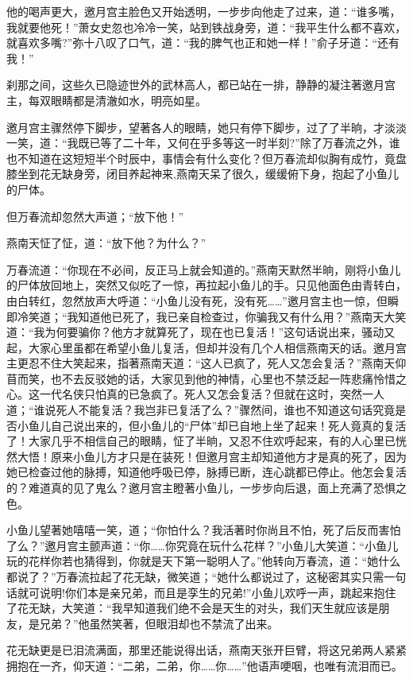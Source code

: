 \documentclass[12pt,oneside]{book}
\begin{document}
他的喝声更大，邀月宫主脸色又开始透明，一步步向他走了过来，道：``谁多嘴，我就要他死！''萧女史忽也冷冷一笑，站到铁战身旁，道：``我平生什么都不喜欢，就喜欢多嘴?''弥十八叹了口气，道：``我的脾气也正和她一样！''俞子牙道：``还有我！''

刹那之间，这些久已隐迹世外的武林高人，都已站在一排，静静的凝注著邀月宫主，每双眼睛都是清澈如水，明亮如星。

邀月宫主骤然停下脚步，望著各人的眼睛，她只有停下脚步，过了了半晌，才淡淡一笑，道：``我既已等了二十年，又何在乎多等这一时半刻?''除了万春流之外，谁也不知道在这短短半个时辰中，事情会有什么变化？但万春流却似胸有成竹，竟盘膝坐到花无缺身旁，闭目养起神来,燕南天呆了很久，缓缓俯下身，抱起了小鱼儿的尸体。

但万春流却忽然大声道；``放下他！''

燕南天怔了怔，道：``放下他？为什么？''

万春流道：``你现在不必间，反正马上就会知道的。''燕南天默然半晌，刚将小鱼儿的尸体放回地上，突然又似吃了一惊，再拉起小鱼儿的手。只见他面色由青转白，由白转红，忽然放声大呼道：``小鱼儿没有死，没有死\ldots\ldots{}''邀月宫主也一惊，但瞬即冷笑道；``我知道他已死了，我已亲自检查过，你骗我又有什么用？''燕南天大笑道：``我为何要骗你？他方才就算死了，现在也已复活！''这句话说出来，骚动又起，大家心里虽都在希望小鱼儿复活，但却并没有几个人相信燕南天的话。邀月宫主更忍不住大笑起来，指著燕南天道：``这人已疯了，死人又怎会复活？''燕南天仰苜而笑，也不去反驳她的话，大家见到他的神情，心里也不禁泛起一阵悲痛怜惜之心。这一代名侠只怕真的已急疯了。死人又怎会复活？但就在这时，突然一人道；``谁说死人不能复活？我岂非已复活了么？''骤然间，谁也不知道这句话究竟是否小鱼儿自己说出来的，但小鱼儿的``尸体''却已自地上坐了起来！死人竟真的复活了！大家几乎不相信自己的眼睛，怔了半晌，又忍不住欢呼起来，有的人心里已恍然大悟！原来小鱼儿方才只是在装死！但邀月宫主却知道他方才是真的死了，因为她已检查过他的脉搏，知道他呼吸已停，脉搏已断，连心跳都已停止。他怎会复活的？难道真的见了鬼么？邀月宫主瞪著小鱼儿，一步步向后退，面上充满了恐惧之色。

小鱼儿望著她嘻嘻一笑，道；``你怕什么？我活著时你尚且不怕，死了后反而害怕了么？''邀月宫主颤声道：``你\ldots\ldots 你究竟在玩什么花样？''小鱼儿大笑道：``小鱼儿玩的花样你若也猜得到，你就是天下第一聪明人了。''他转向万春流，道：``她什么都说了？''万春流拉起了花无缺，微笑道；``她什么都说过了，这秘密其实只需一句话就可说明!你们本是亲兄弟，而且是孪生的兄弟!''小鱼儿欢呼一声，跳起来抱住了花无缺，大笑道：``我早知道我们绝不会是天生的对头，我们天生就应该是朋友，是兄弟？''他虽然笑著，但眼泪却也不禁流了出来。

花无缺更是已泪流满面，那里还能说得出话，燕南天张开巨臂，将这兄弟两人紧紧拥抱在一齐，仰天道：``二弟，二弟，你\ldots\ldots 你\ldots\ldots{}''他语声哽咽，也唯有流泪而已。
\end{document}

